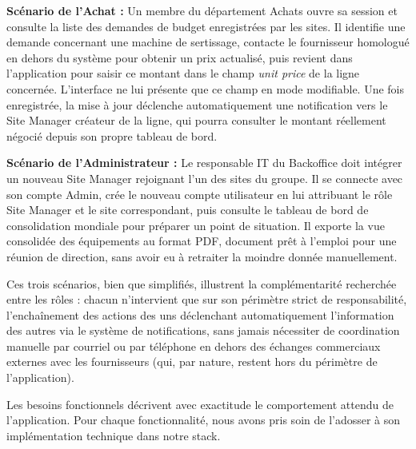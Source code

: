 \textbf{Scénario de l'Achat :} Un membre du département Achats ouvre sa session et consulte la liste des demandes de budget enregistrées par les sites. Il identifie une demande concernant une machine de sertissage, contacte le fournisseur homologué en dehors du système pour obtenir un prix actualisé, puis revient dans l'application pour saisir ce montant dans le champ \textit{unit price} de la ligne concernée. L'interface ne lui présente que ce champ en mode modifiable. Une fois enregistrée, la mise à jour déclenche automatiquement une notification vers le Site Manager créateur de la ligne, qui pourra consulter le montant réellement négocié depuis son propre tableau de bord.

\textbf{Scénario de l'Administrateur :} Le responsable IT du Backoffice doit intégrer un nouveau Site Manager rejoignant l'un des sites du groupe. Il se connecte avec son compte Admin, crée le nouveau compte utilisateur en lui attribuant le rôle Site Manager et le site correspondant, puis consulte le tableau de bord de consolidation mondiale pour préparer un point de situation. Il exporte la vue consolidée des équipements au format PDF, document prêt à l'emploi pour une réunion de direction, sans avoir eu à retraiter la moindre donnée manuellement.

Ces trois scénarios, bien que simplifiés, illustrent la complémentarité recherchée entre les rôles : chacun n'intervient que sur son périmètre strict de responsabilité, l'enchaînement des actions des uns déclenchant automatiquement l'information des autres via le système de notifications, sans jamais nécessiter de coordination manuelle par courriel ou par téléphone en dehors des échanges commerciaux externes avec les fournisseurs (qui, par nature, restent hors du périmètre de l'application).


Les besoins fonctionnels décrivent avec exactitude le comportement attendu de l'application. Pour chaque fonctionnalité, nous avons pris soin de l'adosser à son implémentation technique dans notre stack.

